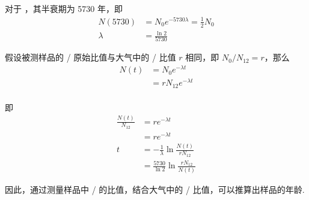 \documentclass{article}
\begin{document}
对于 ，其半衰期为 5730 年，即 
$$
\begin{aligned}
    N(5730) &= N_0 e^{-5730\lambda} = \frac{1}{2} N_0 \\
    \lambda &= \frac{\ln 2}{5730}
\end{aligned}
$$

假设被测样品的 / 原始比值与大气中的 / 比值 $r$ 相同，即 $N_{0}/N_{12} = r$，那么
$$
\begin{aligned}
    N(t) &= N_0 e^{-\lambda t} \\
    &= r N_{12} e^{-\lambda t} \\
\end{aligned}
$$

即
$$
\begin{aligned}
    \frac{N(t)}{N_{12}} &= r e^{-\lambda  t} \\
    &= r e^{-\lambda t} \\
    t &= -\frac{1}{\lambda} \ln \frac{N(t)}{r N_{12}} \\
    &= \frac{5730}{\ln 2} \ln \frac{r N_{12}}{N(t)}
\end{aligned}
$$

因此，通过测量样品中 / 的比值，结合大气中的 / 比值，可以推算出样品的年龄.
\end{document}
